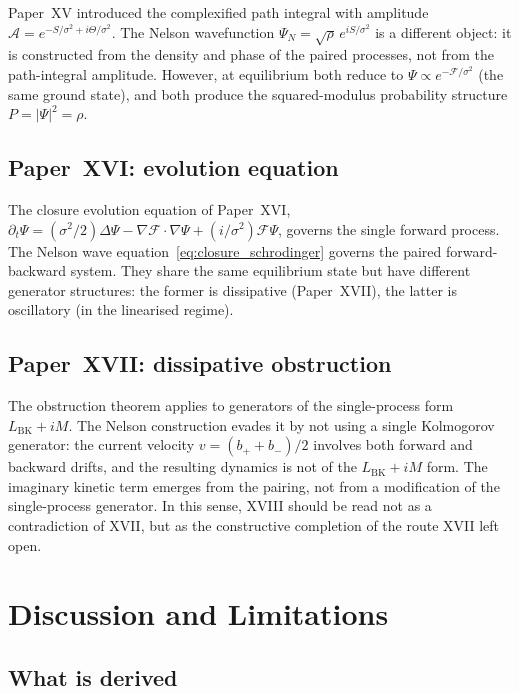 \documentclass[12pt]{article}
\newcommand{\Fcal}{\mathcal{F}}
\begin{document}
Paper~XV introduced the complexified path integral with amplitude $\mathcal{A} = e^{-S/\sigma^2 + i\Theta/\sigma^2}$. The Nelson wavefunction $\Psi_N = \sqrt\rho\, e^{iS/\sigma^2}$ is a different object: it is constructed from the density and phase of the paired processes, not from the path-integral amplitude. However, at equilibrium both reduce to $\Psi \propto e^{-\Fcal/\sigma^2}$ (the same ground state), and both produce the squared-modulus probability structure $P = |\Psi|^2 = \rho$.

\subsection{Paper~XVI: evolution equation}

The closure evolution equation of Paper~XVI, $\partial_t\Psi = ({\sigma^2}/{2})\Delta\Psi - \nabla\Fcal\cdot\nabla\Psi + (i/\sigma^2)\Fcal\Psi$, governs the single forward process. The Nelson wave equation~\eqref{eq:closure_schrodinger} governs the paired forward-backward system. They share the same equilibrium state but have different generator structures: the former is dissipative (Paper~XVII), the latter is oscillatory (in the linearised regime).

\subsection{Paper~XVII: dissipative obstruction}

The obstruction theorem applies to generators of the single-process form $L_{\mathrm{BK}} + iM$. The Nelson construction evades it by not using a single Kolmogorov generator: the current velocity $v = (b_+ + b_-)/2$ involves both forward and backward drifts, and the resulting dynamics is not of the $L_{\mathrm{BK}} + iM$ form. The imaginary kinetic term emerges from the pairing, not from a modification of the single-process generator. In this sense, XVIII should be read not as a contradiction of XVII, but as the constructive completion of the route XVII left open.

\section{Discussion and Limitations}\label{sec:discussion}

\subsection{What is derived}
\end{document}
